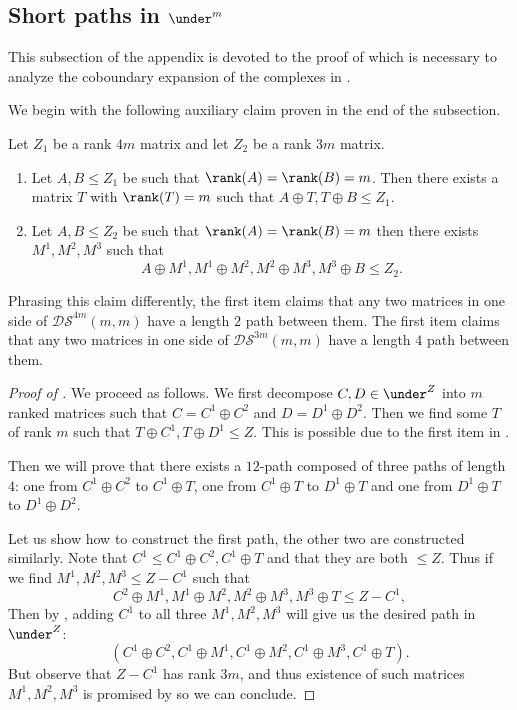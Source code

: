 \subsection[Short paths in the subposet graph]{Short paths in \(\under^m\)} \label{app:short-paths-in-subposet-graph}
This subsection of the appendix is devoted to the proof of  which is necessary to analyze the coboundary expansion of the complexes in \cite{Golowich2023}.

We begin with the following auxiliary claim proven in the end of the subsection.
\begin{claim} \label{claim:connecting-disjoint-matrices-in-under-graph}
    Let \(Z_1\) be a rank \(4m\) matrix and let \(Z_2\) be a rank \(3m\) matrix.
    \begin{enumerate}
        \item Let \(A,B \leq Z_1\) be such that \(\rank(A)=\rank(B)=m\). Then there exists a matrix \(T\) with \(\rank(T)=m\) such that \(A \oplus T, T \oplus B \leq Z_1\).
        \item Let \(A,B \leq Z_2\) be such that \(\rank(A)=\rank(B)=m\) then there exists \(M^1,M^2,M^3\) such that
        \[A \oplus M^1, M^1 \oplus M^2, M^2 \oplus M^3, M^3 \oplus B \leq Z_2.\]
    \end{enumerate}        
\end{claim}
Phrasing this claim differently, the first item claims that any two matrices in one side of \(\mathcal{DS}^{4m}(m,m)\) have a length \(2\) path between them. The first item claims that any two matrices in one side of \(\mathcal{DS}^{3m}(m,m)\) have a length \(4\) path between them.

\begin{proof}[Proof of ]
    We proceed as follows. We first decompose \(C,D \in \under^Z\) into \(m\) ranked matrices such that \(C=C^1 \oplus C^2\) and \(D=D^1 \oplus D^2\). Then we find some \(T\) of rank \(m\) such that \(T \oplus C^1, T \oplus D^1 \leq Z\). This is possible due to the first item in .

    Then we will prove that there exists a \(12\)-path composed of three paths of length \(4\): one from \(C^1\oplus C^2\) to \(C^1 \oplus T\), one from \(C^1 \oplus T\) to \(D^1 \oplus T\) and one from \(D^1 \oplus T\) to \(D^1 \oplus D^2\).

    Let us show how to construct the first path, the other two are constructed similarly. Note that \(C^1 \leq C^1 \oplus C^2, C^1 \oplus T\) and that they are both \(\leq Z\). Thus if we find \(M^1,M^2,M^3 \leq Z-C^1\) such that
    \[C^2 \oplus M^1, M^1 \oplus M^2, M^2 \oplus M^3, M^3 \oplus T \leq Z - C^1,\]
    Then by , adding \(C^1\) to all three \(M^1,M^2,M^3\) will give us the desired path in \(\under^Z\):
    \[(C^1\oplus C^2,C^1\oplus M^1, C^1\oplus M^2, C^1\oplus M^3, C^1\oplus T).\]
    But observe that \(Z-C^1\) has rank \(3m\), and thus existence of such matrices \(M^1,M^2,M^3\) is promised by  so we can conclude.
\end{proof}

